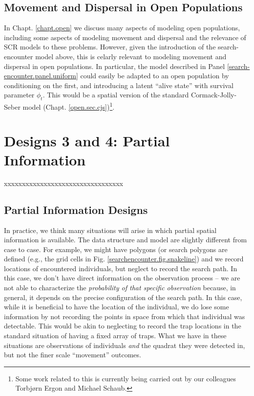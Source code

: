 \subsection{Movement and Dispersal in Open Populations}

In Chapt. \ref{chapt.open} we discuss many aspects of modeling open
populations, including some aspects of modeling movement and dispersal
and the relevance of SCR models to these problems. However, given the
introduction of the search-encounter model above, this is celarly
relevant to modeling movement and dispersal in open populations.  In
particular, the model described in Panel
\ref{search-encounter.panel.uniform} could easily be adapted to an
open population by conditioning on the first, and introducing a latent
``alive state'' with survival parameter $\phi_{t}$. This would be a
spatial version of the standard Cormack-Jolly-Seber model
(Chapt. \ref{open.sec.cjs})\footnote{Some work related to this is
  currently being carried out by our colleagues Torbj{\o}rn Ergon and
  Michael Schaub.}.

\section{Designs 3 and 4: Partial Information}


xxxxxxxxxxxxxxxxxxxxxxxxxxxxxxxxx

\subsection{Partial Information Designs}

In practice, we think many situations will arise in which partial
spatial information is available. The data structure and model are 
slightly different from case to case. 
For example, 
we might have polygons (or search polygons are defined (e.g., the
grid cells in Fig. \ref{searchencounter.fig.snakeline}) and we record
locations of encountered individuals, but neglect to record the search
path.  In this case, we don't have direct information on the
observation process -- we are not able to characterize the {\it
  probability of that specific observation} because, in general, it
depends on the precise configuration of the search path.  In this
case, while it is beneficial to have the location of the individual,
we do lose some information by not recording the points in space from
which that individual was detectable. This would be akin to neglecting
to record the trap locations in the standard situation of having a
fixed array of traps.
What we have in these situations are observations of individuals {\it
  and} the quadrat they were detected in, but not the finer scale
``movement'' outcomes.

